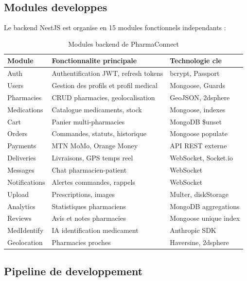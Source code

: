 \documentclass[12pt,a4paper]{report}
\begin{document}
\subsection{Modules developpes}

Le backend NestJS est organise en 15 modules fonctionnels independants :

\begin{table}[ht]
\centering
\caption{Modules backend de PharmaConnect}
\renewcommand{\arraystretch}{1.3}
\begin{tabularx}{\textwidth}{|l|X|l|}
\hline
\rowcolor{vertpharma!20}
\textbf{Module} & \textbf{Fonctionnalite principale} & \textbf{Technologie cle} \\ \hline
Auth & Authentification JWT, refresh tokens & bcrypt, Passport \\ \hline
Users & Gestion des profils et profil medical & Mongoose, Guards \\ \hline
Pharmacies & CRUD pharmacies, geolocalisation & GeoJSON, 2dsphere \\ \hline
Medications & Catalogue medicaments, stock & Mongoose, indexes \\ \hline
Cart & Panier multi-pharmacies & MongoDB \$unset \\ \hline
Orders & Commandes, statuts, historique & Mongoose populate \\ \hline
Payments & MTN MoMo, Orange Money & API REST externe \\ \hline
Deliveries & Livraisons, GPS temps reel & WebSocket, Socket.io \\ \hline
Messages & Chat pharmacien-patient & WebSocket \\ \hline
Notifications & Alertes commandes, rappels & WebSocket \\ \hline
Upload & Prescriptions, images & Multer, diskStorage \\ \hline
Analytics & Statistiques pharmaciens & MongoDB aggregations \\ \hline
Reviews & Avis et notes pharmacies & Mongoose unique index \\ \hline
MedIdentify & IA identification medicament & Anthropic SDK \\ \hline
Geolocation & Pharmacies proches & Haversine, 2dsphere \\ \hline
\end{tabularx}
\end{table}

\subsection{Pipeline de developpement}
\end{document}
